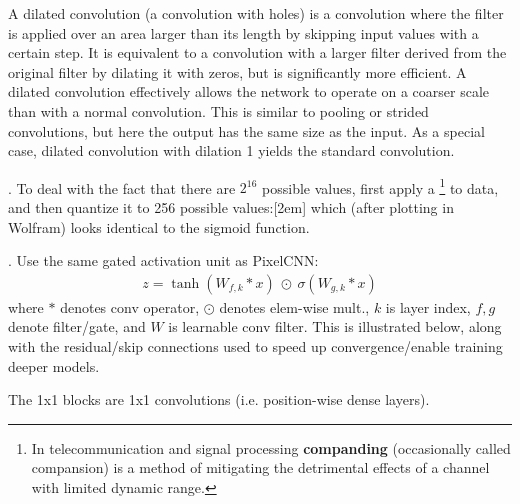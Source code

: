 \documentclass[11pt]{article}
\begin{document}
\begin{definition}
	A dilated convolution (a convolution with holes) is a convolution where the filter is applied over an area larger than its length by skipping input values with a certain step. It is equivalent to a convolution with a larger filter derived from the original filter by dilating it with zeros, but is significantly more efficient. A dilated convolution effectively allows the network to operate on
	a coarser scale than with a normal convolution. This is similar to pooling or strided convolutions, but
	here the output has the same size as the input. As a special case, dilated convolution with dilation
	1 yields the standard convolution.
\end{definition}

\myspace
\p {}. To deal with the fact that there are $2^{16}$ possible values, first apply a \footnote{In telecommunication and signal processing \textbf{companding} (occasionally called compansion) is a method of mitigating the detrimental effects of a channel with limited dynamic range.} to data, and then quantize it to 256 possible values:[2em]
which (after plotting in Wolfram) looks identical to the sigmoid function.

\myspace
\p {}. Use the same gated activation unit as PixelCNN:
\begin{align}
z = \tanh\left( W_{f,k} * x \right) ~ \odot ~ \sigma\left( W_{g,k} * x \right)
\end{align}
where $*$ denotes conv operator, $\odot$ denotes elem-wise mult., $k$ is layer index, $f,g$ denote filter/gate, and $W$ is learnable conv filter. This is illustrated below, along with the residual/skip connections used to speed up convergence/enable training deeper models.


The 1x1 blocks are 1x1 convolutions (i.e. position-wise dense layers). 
\end{document}
